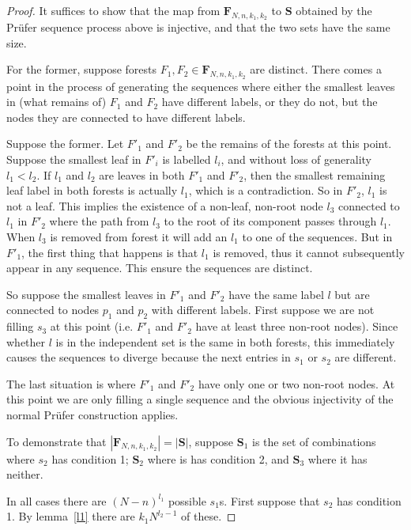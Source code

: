 \documentclass{article}
\newcommand{\fn}{\mathbf{F}_{N,n,k_1,k_2}}
\newcommand{\prufer}{Pr{\"u}fer }
\begin{document}
\begin{proof}
It suffices to show that the map from $\fn$ to $\mathbf{S}$ obtained by the \prufer sequence process above is injective, and that the two sets have the same size. 

For the former, suppose forests $F_1,F_2\in\fn$ are distinct. There comes a point in the process of generating the sequences where either the smallest leaves in (what remains of) $F_1$ and $F_2$ have different labels, or they do not, but the nodes they are connected to have different labels.

Suppose the former. Let $F'_1$ and $F'_2$ be the remains of the forests at this point. Suppose the smallest leaf in $F'_i$ is labelled $l_i$, and without loss of generality $l_1<l_2$. If $l_1$ and $l_2$ are leaves in both $F'_1$ and $F'_2$, then the smallest remaining leaf label in both forests is actually $l_1$, which is a contradiction. So in $F'_2$, $l_1$ is not a leaf. This implies the existence of a non-leaf, non-root node $l_3$ connected to $l_1$ in $F'_2$ where the path from $l_3$ to the root of its component passes through $l_1$. When $l_3$ is removed from forest it will add an $l_1$ to one of the sequences. But in $F'_1$, the first thing that happens is that $l_1$ is removed, thus it cannot subsequently appear in any sequence. This ensure the sequences are distinct.

So suppose the smallest leaves in $F'_1$ and $F'_2$ have the same label $l$ but are connected to nodes $p_1$ and $p_2$ with different labels. First suppose we are not filling $s_3$ at this point (i.e. $F'_1$ and $F'_2$ have at least three non-root nodes). Since whether $l$ is in the independent set is the same in both forests, this immediately causes the sequences to diverge because the next entries in $s_1$ or $s_2$ are different.

The last situation is where $F'_1$ and $F'_2$ have only one or two non-root nodes. At this point we are only filling a single sequence and the obvious injectivity of the normal \prufer construction applies.

To demonstrate that $|\fn|=|\mathbf{S}|$, suppose $\mathbf{S}_1$ is the set of combinations where $s_2$ has condition 1; $\mathbf{S}_2$ where is has condition 2, and $\mathbf{S}_3$ where it has neither.

In all cases there are $(N-n)^{l_1}$ possible $s_1$s. First suppose that $s_2$ has condition 1. By lemma~\ref{l1} there are $k_1N^{l_2-1}$ of these.  


\end{proof}
\end{document}
